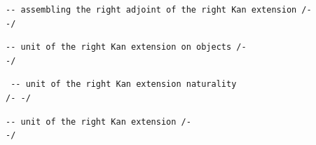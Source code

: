 \documentclass{book}
\theoremstyle{definition}
\newcounter{lcounter}
\begin{document}
\begin{center} \begin{tcolorbox}[width=5in,colback={white},title={\begin{center}\texttt{Lean \thelcounter} \addtocounter{lcounter}{1} \end{center}},colbacktitle=Blue,coltitle=black] \begin{verbatim}
-- assembling the right adjoint of the right Kan extension /-
-/
\end{verbatim} \end{tcolorbox} \end{center}
\begin{center} \begin{tcolorbox}[width=5in,colback={white},title={\begin{center}\texttt{Lean \thelcounter} \addtocounter{lcounter}{1} \end{center}},colbacktitle=Blue,coltitle=black] \begin{verbatim}
-- unit of the right Kan extension on objects /-
-/
\end{verbatim} \end{tcolorbox} \end{center}
\begin{center} \begin{tcolorbox}[width=5in,colback={white},title={\begin{center}\texttt{Lean \thelcounter} \addtocounter{lcounter}{1} \end{center}},colbacktitle=Blue,coltitle=black]

 \begin{verbatim} -- unit of the right Kan extension naturality
/- -/
\end{verbatim} \end{tcolorbox} \end{center}
\begin{center} \begin{tcolorbox}[width=5in,colback={white},title={\begin{center}\texttt{Lean \thelcounter} \addtocounter{lcounter}{1} \end{center}},colbacktitle=Blue,coltitle=black] \begin{verbatim}
-- unit of the right Kan extension /-
-/
\end{verbatim} \end{tcolorbox} \end{center}
\end{document}
